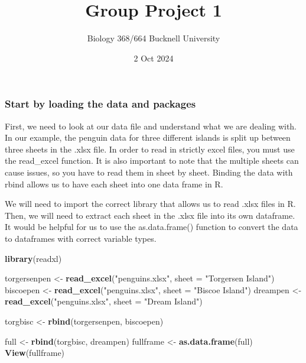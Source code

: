 \documentclass[
]{article}
\title{Group Project 1}
\subtitle{Biology 368/664 Bucknell University}
\author{}
\date{\vspace{-2.5em}2 Oct 2024}
\newenvironment{Shaded}{\begin{snugshade}}{\end{snugshade}}
\newcommand{\AttributeTok}[1]{\textcolor[rgb]{0.13,0.29,0.53}{#1}}
\newcommand{\FunctionTok}[1]{\textcolor[rgb]{0.13,0.29,0.53}{\textbf{#1}}}
\newcommand{\NormalTok}[1]{#1}
\newcommand{\OtherTok}[1]{\textcolor[rgb]{0.56,0.35,0.01}{#1}}
\newcommand{\StringTok}[1]{\textcolor[rgb]{0.31,0.60,0.02}{#1}}
\begin{document}
\maketitle

\subsubsection{Start by loading the data and
packages}\label{start-by-loading-the-data-and-packages}

First, we need to look at our data file and understand what we are
dealing with. In our example, the penguin data for three different
islands is split up between three sheets in the .xlsx file. In order to
read in strictly excel files, you must use the read\_excel function. It
is also important to note that the multiple sheets can cause issues, so
you have to read them in sheet by sheet. Binding the data with rbind
allows us to have each sheet into one data frame in R.

We will need to import the correct library that allows us to read .xlsx
files in R. Then, we will need to extract each sheet in the .xlsx file
into its own dataframe. It would be helpful for us to use the
as.data.frame() function to convert the data to dataframes with correct
variable types.

\begin{Shaded}
\begin{Highlighting}[]
\FunctionTok{library}\NormalTok{(readxl)}

\NormalTok{torgersenpen }\OtherTok{\textless{}{-}} \FunctionTok{read\_excel}\NormalTok{(}\StringTok{"penguins.xlsx"}\NormalTok{, }\AttributeTok{sheet =} \StringTok{"Torgersen Island"}\NormalTok{)}
\NormalTok{biscoepen }\OtherTok{\textless{}{-}} \FunctionTok{read\_excel}\NormalTok{(}\StringTok{"penguins.xlsx"}\NormalTok{, }\AttributeTok{sheet =} \StringTok{"Biscoe Island"}\NormalTok{)}
\NormalTok{dreampen }\OtherTok{\textless{}{-}} \FunctionTok{read\_excel}\NormalTok{(}\StringTok{"penguins.xlsx"}\NormalTok{, }\AttributeTok{sheet =} \StringTok{"Dream Island"}\NormalTok{)}

\NormalTok{torgbisc }\OtherTok{\textless{}{-}} \FunctionTok{rbind}\NormalTok{(torgersenpen, biscoepen)}

\NormalTok{full }\OtherTok{\textless{}{-}} \FunctionTok{rbind}\NormalTok{(torgbisc, dreampen)}
\NormalTok{fullframe }\OtherTok{\textless{}{-}} \FunctionTok{as.data.frame}\NormalTok{(full)}
\FunctionTok{View}\NormalTok{(fullframe)}
\end{Highlighting}
\end{Shaded}
\end{document}
